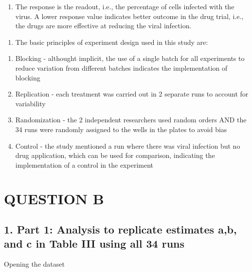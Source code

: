 \documentclass[
]{article}
\providecommand{\tightlist}{%
  \setlength{\itemsep}{0pt}\setlength{\parskip}{0pt}}
\begin{document}
\begin{enumerate}
\def\labelenumi{\alph{enumi}.}
\setcounter{enumi}{21}
\tightlist
\item
  The response is the readout, i.e., the percentage of cells infected
  with the virus. A lower response value indicates better outcome in the
  drug trial, i.e., the drugs are more effective at reducing the viral
  infection.
\end{enumerate}

\begin{enumerate}
\def\labelenumi{\roman{enumi}.}
\setcounter{enumi}{5}
\tightlist
\item
  The basic principles of experiment design used in this study are:
\end{enumerate}

\begin{enumerate}
\def\labelenumi{\arabic{enumi}.}
\tightlist
\item
  Blocking - althought implicit, the use of a single batch for all
  experiments to reduce variation from different batches indicates the
  implementation of blocking
\item
  Replication - each treatment was carried out in 2 separate runs to
  account for variability
\item
  Randomization - the 2 independent researchers used random orders AND
  the 34 runs were randomly assigned to the wells in the plates to avoid
  bias
\item
  Control - the study mentioned a run where there was viral infection
  but no drug application, which can be used for comparison, indicating
  the implementation of a control in the experiment
\end{enumerate}

\hypertarget{question-b}{%
\section{QUESTION B}\label{question-b}}

\hypertarget{part-1-analysis-to-replicate-estimates-ab-and-c-in-table-iii-using-all-34-runs}{%
\subsection{1. Part 1: Analysis to replicate estimates a,b, and c in
Table III using all 34
runs}\label{part-1-analysis-to-replicate-estimates-ab-and-c-in-table-iii-using-all-34-runs}}

Opening the dataset
\end{document}
